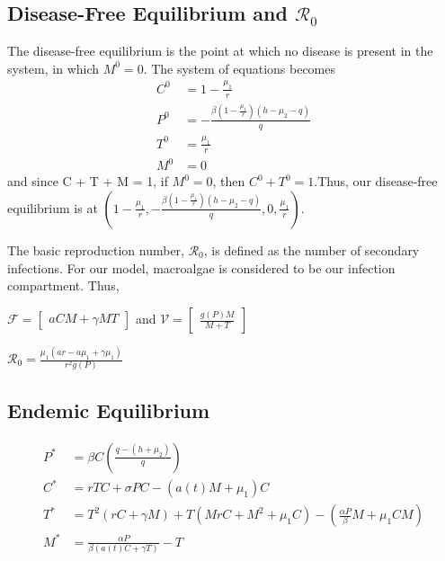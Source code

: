 \documentclass[12pt]{article}
\begin{document}
\subsection{Disease-Free Equilibrium and $\mathscr{R}_{0}$}
The disease-free equilibrium is the point at which no disease is present in the system, in which $M^{0} = 0$. The system of equations becomes
\begin{align*}
        C^{0} &= 1 - \frac{\mu_{1}}{r}\\
        P^{0} &= -\frac{\beta(1 - \frac{\mu_{1}}{r})(h - \mu_{2} - q)}{q}\\
        T^{0} &= \frac{\mu_{1}}{r}\\
        M^{0} &= 0 
\end{align*}
and since C + T + M = 1, if $M^{0} = 0$, then $C^{0} + T^{0} = 1$.Thus, our disease-free equilibrium is at $(1 - \frac{\mu_{1}}{r}, -\frac{\beta(1 - \frac{\mu_{1}}{r})(h - \mu_{2} - q)}{q}, 0, \frac{\mu_{1}}{r})$.

The basic reproduction number, $\mathscr{R}_{0}$, is defined as the number of secondary infections. For our model, macroalgae is considered to be our infection compartment. Thus, 

\begin{center}

$\mathscr{F} = 
\begin{bmatrix} aCM + \gamma MT \end{bmatrix}$ and $\mathscr{V} = \begin{bmatrix} \frac{g(P)M}{M+T} \end{bmatrix}$

$\displaystyle {\mathscr{R}}_{0} = \frac{\mu_{1}(a r - a\mu_{1} + \gamma \mu_{1})}{r^{2}g(P)}$

\end{center}

\subsection{Endemic Equilibrium}
\begin{align*}
        P^{*} &= \beta C \left(\frac{q-(h+\mu_{2})}{q}\right)\\
        C^{*} &= rTC + \sigma PC - (a(t)M+\mu_{1})C\\
        T^{*} &= T^{2}(rC+\gamma M) + T(MrC + M^{2} + \mu_{1}C) - \left(\frac{\alpha P}{\beta}M + \mu_{1} CM\right)\\
        M^{*} &= \frac{\alpha P}{\beta (a(t)C + \gamma T)} - T\\
\end{align*}
\end{document}
